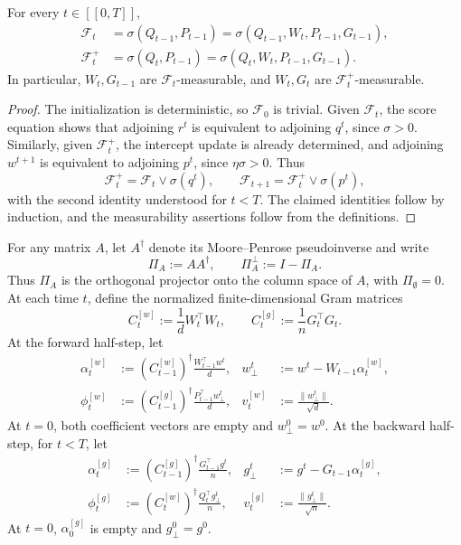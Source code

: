 \begin{lemma}
\label{lemma:equivalent-algorithmic-filtrations}
For every \(t\in[\![0,T]\!]\),
\begin{align}
    \mathcal F_t
    &=
    \sigma(Q_{t-1},P_{t-1})
    =
    \sigma(Q_{t-1},W_t,P_{t-1},G_{t-1}),
    \label{eq:equivalent-forward-filtration}\\
    \mathcal F_t^+
    &=
    \sigma(Q_t,P_{t-1})
    =
    \sigma(Q_t,W_t,P_{t-1},G_{t-1}).
    \label{eq:equivalent-backward-filtration}
\end{align}
In particular, $W_t,G_{t-1}$ are $\mathcal F_t$-measurable,
and $W_t,G_t$ are $\mathcal F_t^+$-measurable.
\end{lemma}

\begin{proof}
The initialization is deterministic, so $\mathcal F_0$ is trivial.
Given $\mathcal F_t$, the score equation shows that adjoining
$r^t$ is equivalent to adjoining $q^t$, since $\sigma>0$.
Similarly, given $\mathcal F_t^+$, the intercept update is
already determined, and adjoining $w^{t+1}$ is equivalent to
adjoining $p^t$, since $\eta\sigma>0$. Thus
\[
    \mathcal F_t^+
    =\mathcal F_t\vee\sigma(q^t),
    \qquad
    \mathcal F_{t+1}
    =\mathcal F_t^+\vee\sigma(p^t),
\]
with the second identity understood for $t<T$.
The claimed identities follow by induction, and the
measurability assertions follow from the definitions.
\end{proof}
For any matrix $A$, let $A^\dagger$ denote its
Moore--Penrose pseudoinverse and write
\[
    \Pi_A:=AA^\dagger,
    \qquad
    \Pi_A^\perp:=I-\Pi_A.
\]
Thus $\Pi_A$ is the orthogonal projector onto the column space
of $A$, with $\Pi_\emptyset=0$.
At each time $t$, define the normalized finite-dimensional Gram matrices
\[
 C_{t}^{[w]}:=\frac1dW_t^\top W_t,
 \qquad
 C_{t}^{[g]}:=\frac1nG_t^\top G_t.
\]
At the forward half-step, let
\begin{align}
 \alpha_{t}^{[w]}
 &:=
 (C_{t-1}^{[w]})^\dagger
 \frac{W_{t-1}^\top w^t}{d},
 &
 w_{\perp}^t
 &:=
 w^t-W_{t-1}\alpha_{t}^{[w]},
 \label{eq:finite-forward-projection-lemmas}\\
 \phi_{t}^{[w]}
 &:=
 (C_{t-1}^{[g]})^\dagger
 \frac{P_{t-1}^\top w_{\perp}^t}{d},
 &
 v_{t}^{[w]}
 &:=
 \frac{\|w_{\perp}^t\|}{\sqrt d}.
 \label{eq:finite-forward-memory-lemmas}
\end{align}
At \(t=0\), both coefficient vectors are empty and
\(w_{\perp}^0=w^0\). At the backward half-step, for \(t<T\), let
\begin{align}
 \alpha_{t}^{[g]}
 &:=
 (C_{t-1}^{[g]})^\dagger
 \frac{G_{t-1}^\top g^t}{n},
 &
 g_{\perp}^t
 &:=
 g^t-G_{t-1}\alpha_{t}^{[g]},
 \label{eq:finite-backward-projection-lemmas}\\
 \phi_{t}^{[g]}
 &:=
 (C_{t}^{[w]})^\dagger
 \frac{Q_t^\top g_{\perp}^t}{n},
 &
 v_{t}^{[g]}
 &:=
 \frac{\|g_{\perp}^t\|}{\sqrt n}.
 \label{eq:finite-backward-memory-lemmas}
\end{align}
At \(t=0\), \(\alpha_{0}^{[g]}\) is empty and
\(g_{\perp}^0=g^0\).

